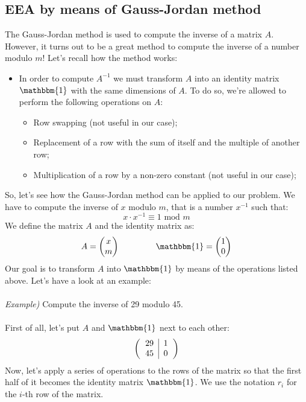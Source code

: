 \documentclass[11pt, a4paper]{article}
\newcommand{\idMatrix}{\mathbbm{1}}
\newcommand{\mymod}{
    \text{ mod }
}
\begin{document}
\subsection{EEA by means of Gauss-Jordan method}
The Gauss-Jordan method is used to compute the inverse of a matrix $A$. However, it turns out to be a great method to compute the inverse of a number modulo $m$! Let's recall how the method works:
\begin{itemize}
    \item In order to compute $A^{-1}$ we must transform $A$ into an identity matrix $\idMatrix$ with the same dimensions of $A$. To do so, we're allowed to perform the following operations on $A$:
    \begin{itemize}
        \item Row swapping (not useful in our case);
        \item Replacement of a row with the sum of itself and the multiple of another row;
        \item Multiplication of a row by a non-zero constant (not useful in our case);
    \end{itemize}
\end{itemize}
So, let's see how the Gauss-Jordan method can be applied to our problem. We have to compute the inverse of $x$ modulo $m$, that is a number $x^{-1}$ such that:
$$x\cdot x^{-1}\equiv1\mymod m$$
We define the matrix $A$ and the identity matrix as:
$$
    A=\begin{pmatrix}
        x\\
        m
    \end{pmatrix}\hspace{1.5cm}
    \idMatrix=\begin{pmatrix}
        1\\
        0
    \end{pmatrix}
$$
Our goal is to transform $A$ into $\idMatrix$ by means of the operations listed above. Let's have a look at an example:\\\\
\textit{Example)} Compute the inverse of 29 modulo 45.\\\\
First of all, let's put $A$ and $\idMatrix$ next to each other:
$$\left(\begin{tabular}{c|c}
    29&1\\
    45&0
\end{tabular}\right)$$
Now, let's apply a series of operations to the rows of the matrix so that the first half of it becomes the identity matrix $\idMatrix$. We use the notation $r_i$ for the $i$-th row of the matrix.
\end{document}
